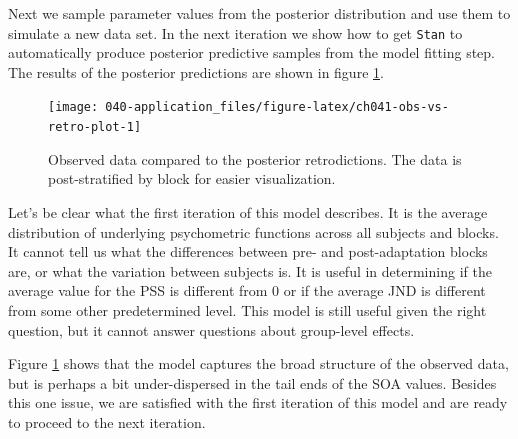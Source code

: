 \documentclass[11pt, oneside, openany]{scrbook}
\newenvironment{Shaded}{\begin{snugshade}}{\end{snugshade}}
\newcommand{\DataTypeTok}[1]{\textcolor[rgb]{0.13,0.29,0.53}{#1}}
\newcommand{\KeywordTok}[1]{\textcolor[rgb]{0.13,0.29,0.53}{\textbf{#1}}}
\newcommand{\NormalTok}[1]{#1}
\newcommand{\OperatorTok}[1]{\textcolor[rgb]{0.81,0.36,0.00}{\textbf{#1}}}
\newcommand{\OtherTok}[1]{\textcolor[rgb]{0.56,0.35,0.01}{#1}}
\newcommand{\StringTok}[1]{\textcolor[rgb]{0.31,0.60,0.02}{#1}}
\begin{document}
Next we sample parameter values from the posterior distribution and use them to simulate a new data set. In the next iteration we show how to get \texttt{Stan} to automatically produce posterior predictive samples from the model fitting step. The results of the posterior predictions are shown in figure \ref{fig:ch041-obs-vs-retro-plot}.


\begin{Shaded}
\end{Shaded}


\begin{figure}

{\centering \texttt{[image: 040-application\_files/figure-latex/ch041-obs-vs-retro-plot-1]} 

}

\caption{Observed data compared to the posterior retrodictions. The data is post-stratified by block for easier visualization.}\label{fig:ch041-obs-vs-retro-plot}
\end{figure}

Let's be clear what the first iteration of this model describes. It is the average distribution of underlying psychometric functions across all subjects and blocks. It cannot tell us what the differences between pre- and post-adaptation blocks are, or what the variation between subjects is. It is useful in determining if the average value for the PSS is different from 0 or if the average JND is different from some other predetermined level. This model is still useful given the right question, but it cannot answer questions about group-level effects.

Figure \ref{fig:ch041-obs-vs-retro-plot} shows that the model captures the broad structure of the observed data, but is perhaps a bit under-dispersed in the tail ends of the SOA values. Besides this one issue, we are satisfied with the first iteration of this model and are ready to proceed to the next iteration.
\end{document}
